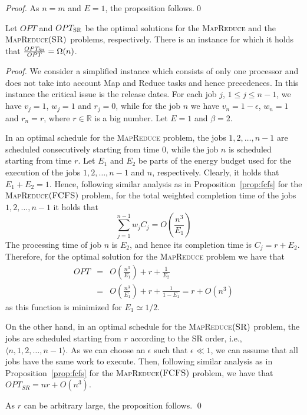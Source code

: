 \documentclass{llncs}
\newcommand{\mr}{\textsc{MapReduce}\xspace}
\newcommand{\fcfs}{\textsc{FCFS}\xspace}
\newcommand{\mrf}{\textsc{MapReduce$(\fcfs)$}\xspace}
\newcommand{\mrsr}{\textsc{MapReduce$(\sr)$}\xspace}
\newcommand{\sr}{\textsc{SR}\xspace}
\begin{document}
\begin{proof}
As $n=m$ and $E=1$, the proposition follows.\qed
\end{proof}

\begin{proposition}\label{prop:sr}
Let $OPT$ and $OPT_{\sr}$ be the optimal solutions for the \mr and the \mrsr problems, respectively.
There is an instance for which it holds that $\frac{OPT_{\sr}}{OPT}=\Omega(n)$.
\end{proposition}
\begin{proof}
We consider a simplified instance which consists of only one processor and does not take into account Map and Reduce tasks and hence precedences.
In this instance the critical issue is the release dates.
For each job $j$, $1 \leq j \leq n-1$, we have $v_j=1$, $w_j=1$ and $r_j=0$,
while for the job $n$ we have $v_n=1-\epsilon$, $w_n=1$ and $r_n=r$, where $r \in \mathbb{R}$ is a big number.
Let $E=1$ and $\beta=2$.

In an optimal schedule for the \mr problem, the jobs $1,2,\ldots,n-1$ are scheduled consecutively starting from time 0,
while the job $n$ is scheduled starting from time $r$.
Let $E_1$ and $E_2$ be parts of the energy budget used for the execution of the jobs $1,2,\ldots,n-1$ and $n$, respectively.
Clearly, it holds that $E_1+E_2=1$.
Hence, following similar analysis as in Proposition~\ref{prop:fcfs} for the \mrf problem,
for the total weighted completion time of the jobs $1,2,\ldots,n-1$ it holds that
\begin{equation*}
\sum_{j=1}^{n-1} w_j C_j = O\left(\frac{n^3}{E_1}\right)
\end{equation*}
The processing time of job $n$ is $E_2$, and hence its completion time is $C_j=r+E_2$.
Therefore, for the optimal solution for the \mr problem we have that
\begin{eqnarray*}
OPT & = & O\left(\frac{n^3}{E_1}\right) + r + \frac{1}{E_2} \\
 & = & O\left(\frac{n^3}{E_1}\right) + r + \frac{1}{1-E_1}
 = r + O(n^3)
\end{eqnarray*}
as this function is minimized for $E_1\simeq1/2$.

On the other hand, in an optimal schedule for the \mrsr problem,
the jobs are scheduled starting from $r$ according to the \sr order, i.e., $\langle n,1,2,\ldots,n-1\rangle$.
As we can choose an $\epsilon$ such that $\epsilon\ll1$, we can assume that all jobs have the same work to execute.
Then, following similar analysis as in Proposition~\ref{prop:fcfs} for the \mrf problem,
we have that $OPT_{SR}=nr+O(n^3)$.

As $r$ can be arbitrary large, the proposition follows. \qed
\end{proof}
\end{document}

